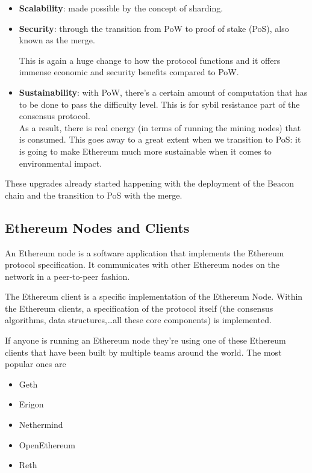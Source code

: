 \begin{itemize}
\item
  \textbf{Scalability}: made possible by the concept of sharding.\\
\item
  \textbf{Security}: through the transition from PoW to proof of stake
  (PoS), also known as the merge.

  This is again a huge change to how the protocol functions and it
  offers immense economic and security benefits compared to PoW.\\
\item
  \textbf{Sustainability}: with PoW, there's a certain amount of
  computation that has to be done to pass the difficulty level. This is
  for sybil resistance part of the consensus protocol.\\

  As a result, there is real energy (in terms of running the mining
  nodes) that is consumed. This goes away to a great extent when we
  transition to PoS: it is going to make Ethereum much more sustainable
  when it comes to environmental impact.
\end{itemize}

These upgrades already started happening with the deployment of the
Beacon chain and the transition to PoS with the merge.

\subsection{Ethereum Nodes and
Clients}\label{ethereum-nodes-and-clients}

An Ethereum node is a software application that implements the Ethereum
protocol specification. It communicates with other Ethereum nodes on the
network in a peer-to-peer fashion.

The Ethereum client is a specific implementation of the Ethereum Node.
Within the Ethereum clients, a specification of the protocol itself (the
consensus algorithms, data structures,\dots all these core components)
is implemented.

If anyone is running an Ethereum node they're using one of these
Ethereum clients that have been built by multiple teams around the
world. The most popular ones are

\begin{itemize}
\tightlist
\item
  Geth
\item
  Erigon
\item
  Nethermind
\item
  OpenEthereum
\item
  Reth
\end{itemize}

